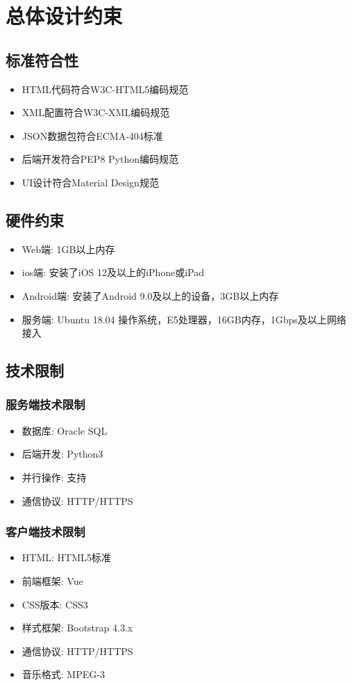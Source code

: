 \chapter{总体设计约束}


\section{标准符合性}


\begin{itemize}
	\item HTML代码符合W3C-HTML5编码规范
	\item XML配置符合W3C-XML编码规范 
	\item JSON数据包符合ECMA-404标准 
	\item 后端开发符合PEP8 Python编码规范 
	\item UI设计符合Material Design规范
\end{itemize}


\section{硬件约束}

\begin{itemize}
	\item Web端: 1GB以上内存
	\item ios端: 安装了iOS 12及以上的iPhone或iPad
	\item Android端: 安装了Android 9.0及以上的设备，3GB以上内存
	\item 服务端: Ubuntu 18.04 操作系统，E5处理器，16GB内存，1Gbps及以上网络接入
\end{itemize}


\section{技术限制}

\subsection{服务端技术限制}

\begin{itemize}
	\item 数据库: Oracle SQL
	\item 后端开发: Python3
	\item 并行操作: 支持
	\item 通信协议: HTTP/HTTPS
\end{itemize}

\subsection{客户端技术限制}

\begin{itemize}
	\item HTML: HTML5标准
	\item 前端框架: Vue
	\item CSS版本: CSS3
	\item 样式框架: Bootstrap 4.3.x
	\item 通信协议: HTTP/HTTPS
	\item 音乐格式: MPEG-3
\end{itemize}

